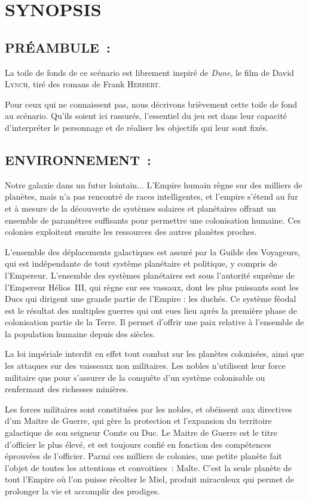 \documentclass[14pt,twocolumn]{extarticle}
\begin{document}
\section{SYNOPSIS}

\subsection{PRÉAMBULE~:}

La toile de fonds de ce scénario est librement inspiré de \textit{Dune}, le
film de David \textsc{Lynch}, tiré des romans de Frank \textsc{Herbert}.

Pour ceux qui ne connaissent pas, nous décrivons brièvement cette toile de fond 
au scénario. Qu'ils soient ici rassurés, l'essentiel du jeu est dans leur
capacité d'interpréter le personnage et de réaliser les objectifs qui leur
sont fixés.

\subsection{ENVIRONNEMENT~:}

Notre galaxie dans un futur lointain... L'Empire humain règne sur des milliers
de planètes, mais n'a pas rencontré de races intelligentes, et l'empire s'étend
au fur et à mesure de la découverte de systèmes solaires et planétaires offrant
un ensemble de paramètres suffisants pour permettre une colonisation humaine.
Ces colonies exploitent ensuite les ressources des autres planètes proches.

L'ensemble des déplacements galactiques est assuré par la Guilde des Voyageurs,
qui est indépendante de tout système planétaire et politique, y compris de
l'Empereur. L'ensemble des systèmes planétaires est sous l'autorité suprême de
l'Empereur Hélios~III, qui règne sur ses vassaux, dont les plus puissants sont
les Ducs qui dirigent une grande partie de l'Empire : les duchés. Ce système
féodal est le résultat des multiples guerres qui ont eues lieu après la
première phase de colonisation partie de la Terre. Il permet d'offrir une paix
relative à l'ensemble de la population humaine depuis des siècles.

La loi impériale interdit en effet tout combat sur les planètes colonisées,
ainsi que les attaques sur des vaisseaux non militaires. Les nobles n'utilisent
leur force militaire que pour s'assurer de la conquête d'un système colonisable
ou renfermant des richesses minières.

Les forces militaires sont constituées par les nobles, et obéissent aux
directives d'un Maitre de Guerre, qui gère la protection et l'expansion du
territoire galactique de son seigneur Comte ou Duc. Le Maitre de Guerre
est le titre d'officier le plus élevé, et est toujours confié en fonction des
compétences éprouvées de l'officier. Parmi ces milliers de colonies, une
petite planète fait l'objet de toutes les attentions et convoitises~: Malte.
C'est la seule planète de tout l'Empire où l'on puisse récolter le Miel,
produit miraculeux qui permet de prolonger la vie et accomplir des prodiges.
\end{document}
